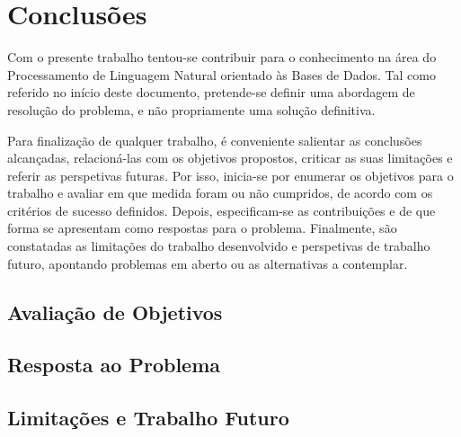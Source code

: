 \chapter{Conclusões}
\label{chap:Chapter5}
Com o presente trabalho tentou-se contribuir para o conhecimento na área do Processamento de Linguagem Natural orientado às Bases de Dados. Tal como referido no início deste documento, pretende-se definir uma abordagem de resolução do problema, e não propriamente uma solução definitiva.

Para finalização de qualquer trabalho, é conveniente salientar as conclusões alcançadas, relacioná-las com os objetivos propostos, criticar as suas limitações e referir as perspetivas futuras. Por isso, inicia-se por enumerar os objetivos para o trabalho e avaliar em que medida foram ou não cumpridos, de acordo com os critérios de sucesso definidos. Depois, especificam-se as contribuições e de que forma se apresentam como respostas para o problema. Finalmente, são constatadas as limitações do trabalho desenvolvido e perspetivas de trabalho futuro, apontando problemas em aberto ou as alternativas a contemplar.

\section{Avaliação de Objetivos} 
\label{sec:chap05_goals_evaluation}
\tbd

\section{Resposta ao Problema} 
\label{sec:chap05_problem_response}
\tbd

\section{Limitações e Trabalho Futuro} 
\label{sec:chap05_future_work_limitations}
\tbd
